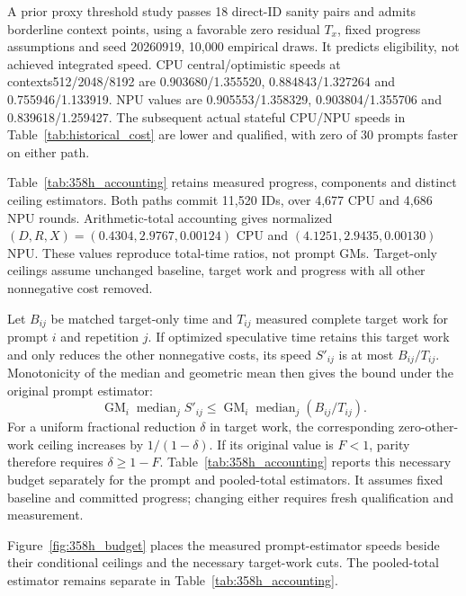 A prior proxy threshold study passes 18 direct-ID sanity pairs and admits borderline context points, using a favorable zero residual $T_x$, fixed progress assumptions and seed 20260919, 10,000 empirical draws. It predicts eligibility, not achieved integrated speed. CPU central/optimistic speeds at contexts512/2048/8192 are 0.903680/1.355520, 0.884843/1.327264 and 0.755946/1.133919. NPU values are 0.905553/1.358329, 0.903804/1.355706 and 0.839618/1.259427. The subsequent actual stateful CPU/NPU speeds in Table~\ref{tab:historical_cost} are lower and qualified, with zero of 30 prompts faster on either path.

Table~\ref{tab:358h_accounting} retains measured progress, components and distinct ceiling estimators. Both paths commit 11,520 IDs, over 4,677 CPU and 4,686 NPU rounds. Arithmetic-total accounting gives normalized $(D,R,X)=(0.4304,2.9767,0.00124)$ CPU and $(4.1251,2.9435,0.00130)$ NPU. These values reproduce total-time ratios, not prompt GMs. Target-only ceilings assume unchanged baseline, target work and progress with all other nonnegative cost removed.

Let $B_{ij}$ be matched target-only time and $T_{ij}$ measured complete target work for prompt $i$ and repetition $j$. If optimized speculative time retains this target work and only reduces the other nonnegative costs, its speed $S'_{ij}$ is at most $B_{ij}/T_{ij}$. Monotonicity of the median and geometric mean then gives the bound under the original prompt estimator:
\begin{equation}
\operatorname{GM}_{i}\operatorname{median}_{j} S'_{ij}
\leq \operatorname{GM}_{i}\operatorname{median}_{j}(B_{ij}/T_{ij}).
\label{eq:floor}
\end{equation}
For a uniform fractional reduction $\delta$ in target work, the corresponding zero-other-work ceiling increases by $1/(1-\delta)$. If its original value is $F<1$, parity therefore requires $\delta\geq 1-F$. Table~\ref{tab:358h_accounting} reports this necessary budget separately for the prompt and pooled-total estimators. It assumes fixed baseline and committed progress; changing either requires fresh qualification and measurement.

Figure~\ref{fig:358h_budget} places the measured prompt-estimator speeds beside their conditional ceilings and the necessary target-work cuts. The pooled-total estimator remains separate in Table~\ref{tab:358h_accounting}.

